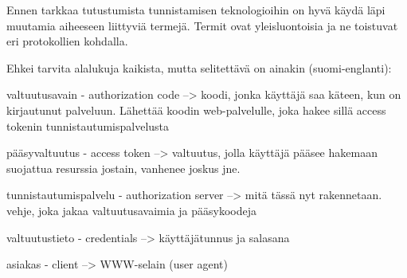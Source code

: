 Ennen tarkkaa tutustumista tunnistamisen teknologioihin on hyvä käydä läpi muutamia aiheeseen liittyviä termejä. Termit ovat yleisluontoisia ja ne toistuvat eri protokollien kohdalla.

Ehkei tarvita alalukuja kaikista, mutta selitettävä on ainakin (suomi-englanti):

valtuutusavain - authorization code
--> koodi, jonka käyttäjä saa käteen, kun on kirjautunut palveluun. Lähettää koodin web-palvelulle, joka hakee sillä access tokenin tunnistautumispalvelusta

pääsyvaltuutus - access token
--> valtuutus, jolla käyttäjä pääsee hakemaan suojattua resurssia jostain, vanhenee joskus jne.

tunnistautumispalvelu - authorization server
--> mitä tässä nyt rakennetaan. vehje, joka jakaa valtuutusavaimia ja pääsykoodeja

valtuutustieto - credentials
--> käyttäjätunnus ja salasana

asiakas - client
--> WWW-selain (user agent)